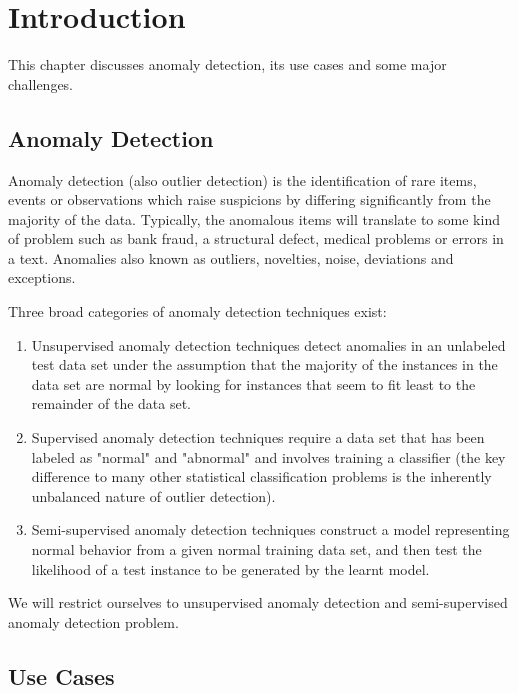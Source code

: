 \chapter{Introduction}
\label{ch:introduction}
\hspace{3mm}

This chapter discusses anomaly detection, its use cases and some major challenges.

\section{Anomaly Detection}
\label{sec:anomaly-detection-definition}

Anomaly detection (also outlier detection) is the identification of rare items, events or observations which raise suspicions by differing significantly from the majority of the data.
Typically, the anomalous items will translate to some kind of problem such as bank fraud, a structural defect, medical problems or errors in a text.
Anomalies also known as outliers, novelties, noise, deviations and exceptions.

Three broad categories of anomaly detection techniques exist:

\begin{enumerate}
    \item Unsupervised anomaly detection techniques detect anomalies in an unlabeled test data set under the assumption that the majority of the instances in the data set are normal by looking for instances that seem to fit least to the remainder of the data set.
    \item Supervised anomaly detection techniques require a data set that has been labeled as "normal" and "abnormal" and involves training a classifier (the key difference to many other statistical classification problems is the inherently unbalanced nature of outlier detection).
    \item Semi-supervised anomaly detection techniques construct a model representing normal behavior from a given normal training data set, and then test the likelihood of a test instance to be generated by the learnt model.
\end{enumerate}

We will restrict ourselves to unsupervised anomaly detection and semi-supervised anomaly detection problem.

\section{Use Cases}
\label{sec:anomaly-detection-use-cases}

